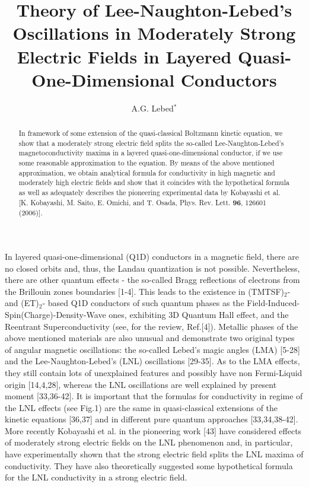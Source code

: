 \documentclass[prl,aps,showpacs,twocolumn,floatfix]{revtex4}
\begin{document}


\title{Theory of Lee-Naughton-Lebed's
Oscillations in Moderately Strong Electric Fields in Layered
Quasi-One-Dimensional Conductors}

\author{A.G. Lebed$^*$}






\begin{abstract}
In framework of some extension of the quasi-classical Boltzmann
kinetic equation, we show that a moderately strong electric field
splits the so-called Lee-Naughton-Lebed's magnetoconductivity
maxima in a layered quasi-one-dimensional conductor, if we use
some reasonable approximation to the equation. By means of the
above mentioned approximation, we obtain analytical formula for
conductivity in high magnetic and moderately high electric fields
and show that it coincides with the hypothetical formula as well
as adequately describes the pioneering experimental data by
Kobayashi et al. [K. Kobayashi, M. Saito, E. Omichi, and T. Osada,
Phys. Rev. Lett. \textbf{96}, 126601 (2006)].
\end{abstract}



\maketitle

In layered quasi-one-dimensional (Q1D) conductors in a magnetic
field, there are no closed orbits and, thus, the Landau
quantization is not possible. Nevertheless, there are other
quantum effects - the so-called Bragg reflections of electrons
from the Brillouin zones boundaries [1-4]. This leads to the
existence in (TMTSF)$_2$- and (ET)$_2$- based Q1D conductors of
such quantum phases as the Field-Induced-Spin(Charge)-Density-Wave
ones, exhibiting 3D Quantum Hall effect, and the Reentrant
Superconductivity (see, for the review, Ref.[4]). Metallic phases
of the above mentioned materials are also unusual and demonstrate
two original types of angular magnetic oscillations: the so-called
Lebed's magic angles (LMA) [5-28] and the Lee-Naughton-Lebed's
(LNL) oscillations [29-35]. As to the LMA effects, they still
contain lots of unexplained features and possibly have non
Fermi-Liquid origin [14,4,28], whereas the LNL oscillations are
well explained by present moment [33,36-42]. It is important that
the formulas for conductivity in regime of the LNL effects (see
Fig.1) are the same in quasi-classical extensions of the kinetic
equations [36,37] and in different pure quantum approaches
[33,34,38-42]. More recently Kobayashi et al. in the pioneering
work [43] have considered effects of moderately strong electric
fields on the LNL phenomenon and, in particular, have
experimentally shown that the strong electric field splits the LNL
maxima of conductivity. They have also theoretically suggested
some hypothetical formula for the LNL conductivity in a strong
electric field.
\end{document}
